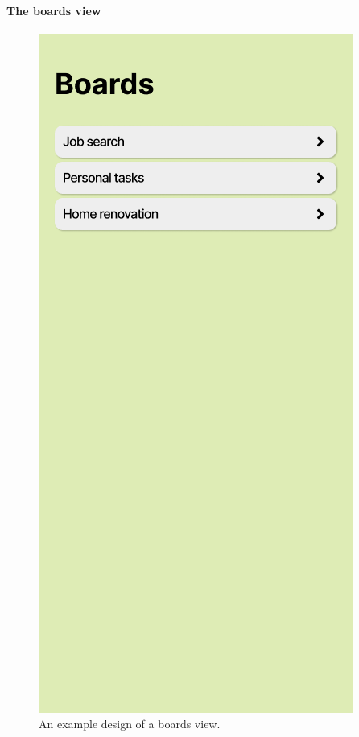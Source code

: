\paragraph{The boards view}

\begin{figure}
    \centering
    \begin{minipage}{0.45\textwidth}
        \centering
        \includegraphics[height=0.4\textheight]{./3-research-methodology/boards-view}
        \caption{An example design of a boards view.}
        \label{fig:3-4-boards-view}
    \end{minipage}

\end{figure}
